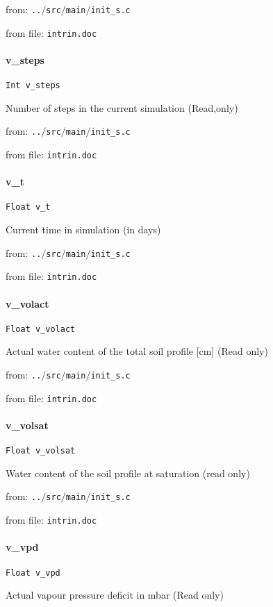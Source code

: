 from: {\tt ..$/$src$/$main$/$init\_s.c}

from file: {\tt intrin.doc}


\paragraph{v\_steps}
\begin{verbatim}
Int v_steps
\end{verbatim}
Number of steps in the current simulation (Read,only) 


from: {\tt ..$/$src$/$main$/$init\_s.c}

from file: {\tt intrin.doc}


\paragraph{v\_t}
\begin{verbatim}
Float v_t
\end{verbatim}
Current time in simulation (in days) 


from: {\tt ..$/$src$/$main$/$init\_s.c}

from file: {\tt intrin.doc}


\paragraph{v\_volact}
\begin{verbatim}
Float v_volact
\end{verbatim}
Actual water content of the total soil profile [cm] (Read only)


from: {\tt ..$/$src$/$main$/$init\_s.c}

from file: {\tt intrin.doc}


\paragraph{v\_volsat}
\begin{verbatim}
Float v_volsat
\end{verbatim}
Water content of the soil profile at saturation (read only)


from: {\tt ..$/$src$/$main$/$init\_s.c}

from file: {\tt intrin.doc}


\paragraph{v\_vpd}
\begin{verbatim}
Float v_vpd
\end{verbatim}
Actual vapour pressure deficit in mbar (Read only)



